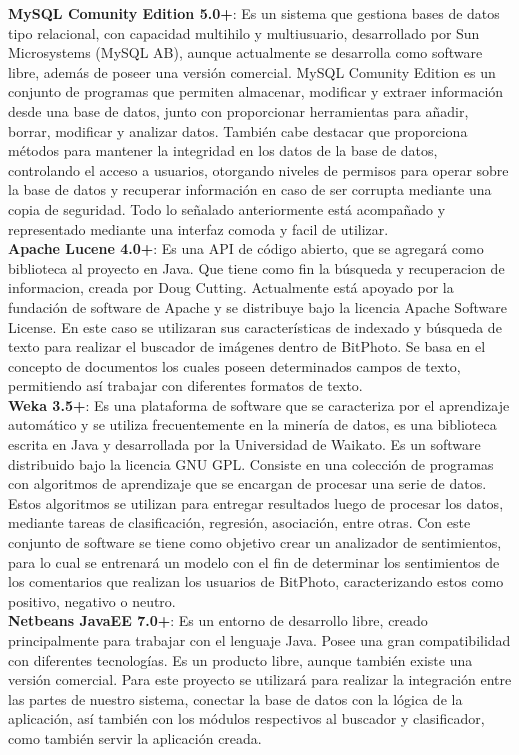 \documentclass{memoria}
\begin{document}
\textbf{MySQL Comunity Edition 5.0+}: Es un sistema que gestiona bases de datos tipo relacional, con capacidad multihilo y multiusuario, desarrollado por Sun Microsystems (MySQL AB), aunque actualmente se desarrolla como software libre, además de poseer una versión comercial. MySQL Comunity Edition es un conjunto de programas que permiten almacenar, modificar y extraer información desde una base de datos, junto con proporcionar herramientas para añadir, borrar, modificar y analizar datos. También cabe destacar que proporciona métodos para mantener la integridad en los datos de la base de datos, controlando el acceso a usuarios, otorgando niveles de permisos para operar sobre la base de datos y recuperar información en caso de ser corrupta mediante una copia de seguridad. Todo lo señalado anteriormente está acompañado y representado mediante una interfaz comoda y facil de utilizar.\\

\textbf{Apache Lucene 4.0+}: Es una API de código abierto, que se agregará como biblioteca al proyecto en Java. Que tiene como fin la búsqueda y recuperacion de informacion, creada por Doug Cutting. Actualmente está apoyado por la fundación de software de Apache y se distribuye bajo la licencia Apache Software License. En este caso se utilizaran sus características de indexado y búsqueda de texto para realizar el buscador de imágenes dentro de BitPhoto. Se basa en el concepto de documentos los cuales poseen determinados campos de texto, permitiendo así trabajar con diferentes formatos de texto.\\

\textbf{Weka 3.5+}: Es una plataforma de software que se caracteriza por el aprendizaje automático y se utiliza frecuentemente en la minería de datos, es una biblioteca escrita en Java y desarrollada por la Universidad de Waikato. Es un software distribuido bajo la licencia GNU GPL. Consiste en una colección de programas con algoritmos de aprendizaje que se encargan de procesar una serie de datos. Estos algoritmos se utilizan para entregar resultados luego de procesar los datos, mediante tareas de clasificación, regresión, asociación, entre otras. Con este conjunto de software se tiene como objetivo crear un analizador de sentimientos, para lo cual se entrenará un modelo con el fin de determinar los sentimientos de los comentarios que realizan los usuarios de BitPhoto, caracterizando estos como positivo, negativo o neutro.\\

\textbf{Netbeans JavaEE 7.0+}: Es un entorno de desarrollo libre, creado principalmente para trabajar con el lenguaje Java. Posee una gran compatibilidad con diferentes tecnologías. Es un producto libre, aunque también existe una versión comercial. Para este proyecto se utilizará para realizar la integración entre las partes de nuestro sistema, conectar la base de datos con la lógica de la aplicación, así también con los módulos respectivos al buscador y clasificador, como también servir la aplicación creada.\\
\end{document}
